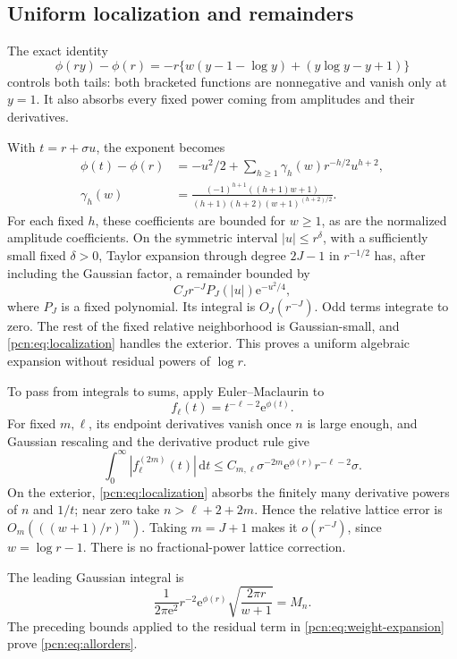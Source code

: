 \documentclass[11pt,letterpaper]{article}
\theoremstyle{remark}\newtheorem{remark}[theorem]{Remark}
\newcommand{\dd}{\,\mathrm d}
\newcommand{\ee}{\mathrm e}
\begin{document}
\subsection{Uniform localization and remainders}
The exact identity
\begin{equation}\label{pcn:eq:localization}
 \phi(ry)-\phi(r)
 =-r\{w(y-1-\log y)+(y\log y-y+1)\}
\end{equation}
controls both tails: both bracketed functions are nonnegative and vanish only at $y=1$. It also absorbs every fixed power coming from amplitudes and their derivatives.

With $t=r+\sigma u$, the exponent becomes
\begin{align}
 \phi(t)-\phi(r)&=-u^2/2+
          \sum_{h\ge1}\gamma_h(w)r^{-h/2}u^{h+2},\label{pcn:eq:gaussianexp}\\
 \gamma_h(w)&=
 \frac{(-1)^{h+1}((h+1)w+1)}{(h+1)(h+2)(w+1)^{(h+2)/2}}.
\end{align}
For each fixed $h$, these coefficients are bounded for $w\ge1$, as are the normalized amplitude coefficients. On the symmetric interval $|u|\le r^\delta$, with a sufficiently small fixed $\delta>0$, Taylor expansion through degree $2J-1$ in $r^{-1/2}$ has, after including the Gaussian factor, a remainder bounded by
\[
 C_Jr^{-J}P_J(|u|)\ee^{-u^2/4},
\]
where $P_J$ is a fixed polynomial. Its integral is $O_J(r^{-J})$. Odd terms integrate to zero. The rest of the fixed relative neighborhood is Gaussian-small, and \eqref{pcn:eq:localization} handles the exterior. This proves a uniform algebraic expansion without residual powers of $\log r$.

To pass from integrals to sums, apply Euler--Maclaurin to
\[
 f_\ell(t)=t^{-\ell-2}\ee^{\phi(t)}.
\]
For fixed $m,\ell$, its endpoint derivatives vanish once $n$ is large enough, and Gaussian rescaling and the derivative product rule give
\begin{equation}\label{pcn:eq:EMderivative}
 \int_0^\infty|f_\ell^{(2m)}(t)|\dd t
 \le C_{m,\ell}\sigma^{-2m}\ee^{\phi(r)}r^{-\ell-2}\sigma.
\end{equation}
On the exterior, \eqref{pcn:eq:localization} absorbs the finitely many derivative powers of $n$ and $1/t$; near zero take $n>\ell+2+2m$. Hence the relative lattice error is $O_m(((w+1)/r)^m)$. Taking $m=J+1$ makes it $o(r^{-J})$, since $w=\log r-1$. There is no fractional-power lattice correction.

The leading Gaussian integral is
\[
 \frac{1}{2\pi\ee^2}r^{-2}\ee^{\phi(r)}\sqrt{\frac{2\pi r}{w+1}}=M_n.
\]
The preceding bounds applied to the residual term in \eqref{pcn:eq:weight-expansion} prove \eqref{pcn:eq:allorders}.
\end{document}
